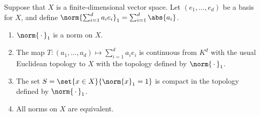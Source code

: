 \documentclass[article, a4paper, 11pt, oneside]{memoir}
\numberwithin{equation}{chapter}
\theoremstyle{nonumberplain}
\begin{document}
\begin{exerciseframed*}[6]
	Suppose that $X$ is a finite-dimensional vector space. Let $(e_1, \ldots, e_d)$ be a basis for $X$, and define $\norm{\sum_{i=1}^d a_i e_i}_1 = \sum_{i=1}^d \abs{a_i}$.
	\begin{enumerate}
		\item $\norm{\,\cdot\,}_1$ is a norm on $X$.
		\item The map $T \colon (a_1, \ldots, a_d) \mapsto \sum_{i=1}^d a_i e_i$ is continuous from $K^d$ with the usual Euclidean topology to $X$ with the topology defined by $\norm{\,\cdot\,}_1$.
		\item The set $S = \set{x \in X}{\norm{x}_1 = 1}$ is compact in the topology defined by $\norm{\,\cdot\,}_1$.
		\item All norms on $X$ are equivalent.
	\end{enumerate}
\end{exerciseframed*}
\end{document}
